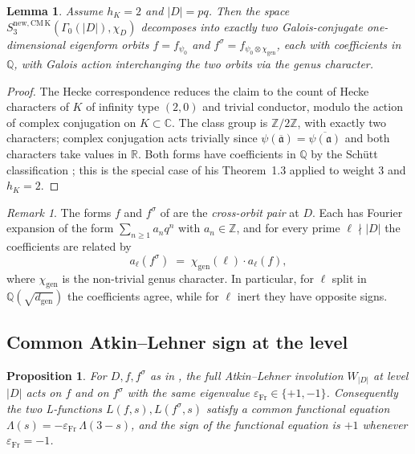 \documentclass[11pt]{amsart}
\newtheorem{proposition}[theorem]{Proposition}
\newtheorem{lemma}[theorem]{Lemma}
\theoremstyle{definition}
\theoremstyle{remark}
\newtheorem{remark}[theorem]{Remark}
\newcommand{\Q}{\mathbb{Q}}
\newcommand{\Z}{\mathbb{Z}}
\newcommand{\C}{\mathbb{C}}
\newcommand{\R}{\mathbb{R}}
\newcommand{\chiD}{\chi_D}
\begin{document}
\begin{lemma}\label{lem:dim1-orbits}
Assume \(h_{K} = 2\) and \(|D| = pq\). Then the space
\(S_{3}^{\mathrm{new}, \mathrm{CM\,K}}(\Gamma_{0}(|D|), \chiD)\)
decomposes into exactly two Galois-conjugate one-dimensional
eigenform orbits \(f = f_{\psi_{0}}\) and
\(f^{\sigma} = f_{\psi_{0} \otimes \chi_{\mathrm{gen}}}\), each with
coefficients in \(\Q\), with Galois action interchanging the two
orbits via the genus character.
\end{lemma}

\begin{proof}
The Hecke correspondence reduces the claim to the count of Hecke
characters of \(K\) of infinity type \((2, 0)\) and trivial
conductor, modulo the action of complex conjugation on
\(K \subset \C\). The class group is \(\Z/2\Z\), with exactly two
characters; complex conjugation acts trivially since
\(\psi(\overline{\mathfrak{a}}) = \overline{\psi(\mathfrak{a})}\)
and both characters take values in \(\R\). Both forms have
coefficients in \(\Q\) by the Sch\"utt classification
\cite{Schuett2008}; this is the special case of his Theorem~1.3
applied to weight \(3\) and \(h_{K} = 2\).
\end{proof}

\begin{remark}
The forms \(f\) and \(f^{\sigma}\) of  are the
\emph{cross-orbit pair} at \(D\). Each has Fourier expansion of the
form
\(\sum_{n \ge 1} a_{n} q^{n}\) with \(a_{n} \in \Z\), and for every
prime \(\ell \nmid |D|\) the coefficients are related by
\[
   a_{\ell}(f^{\sigma})
   \;=\;
   \chi_{\mathrm{gen}}(\ell) \cdot a_{\ell}(f) ,
\]
where \(\chi_{\mathrm{gen}}\) is the non-trivial genus character.
In particular, for \(\ell\) split in \(\Q(\sqrt{d_{\mathrm{gen}}})\)
the coefficients agree, while for \(\ell\) inert they have opposite
signs.
\end{remark}

\subsection{Common Atkin--Lehner sign at the level}

\begin{proposition}\label{prop:same-fricke}
For \(D, f, f^{\sigma}\) as in , the full
Atkin--Lehner involution \(W_{|D|}\) at level \(|D|\) acts on \(f\)
and on \(f^{\sigma}\) with the same eigenvalue
\(\varepsilon_{\mathrm{Fr}} \in \{+1, -1\}\). Consequently the two
L-functions \(L(f, s), L(f^{\sigma}, s)\) satisfy a common functional
equation \(\Lambda(s) = -\varepsilon_{\mathrm{Fr}}\,\Lambda(3-s)\),
and the sign of the functional equation is \(+1\) whenever
\(\varepsilon_{\mathrm{Fr}} = -1\).
\end{proposition}
\end{document}
